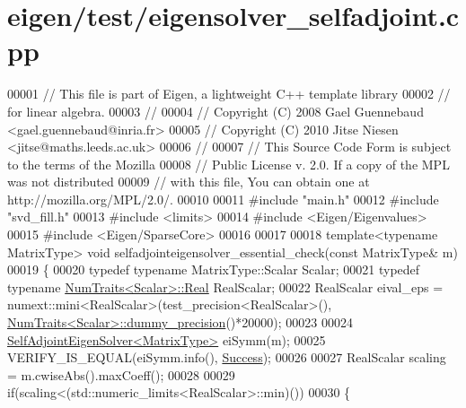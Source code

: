 \hypertarget{eigen_2test_2eigensolver__selfadjoint_8cpp_source}{}\section{eigen/test/eigensolver\+\_\+selfadjoint.cpp}
\label{eigen_2test_2eigensolver__selfadjoint_8cpp_source}

\begin{DoxyCode}
00001 \textcolor{comment}{// This file is part of Eigen, a lightweight C++ template library}
00002 \textcolor{comment}{// for linear algebra.}
00003 \textcolor{comment}{//}
00004 \textcolor{comment}{// Copyright (C) 2008 Gael Guennebaud <gael.guennebaud@inria.fr>}
00005 \textcolor{comment}{// Copyright (C) 2010 Jitse Niesen <jitse@maths.leeds.ac.uk>}
00006 \textcolor{comment}{//}
00007 \textcolor{comment}{// This Source Code Form is subject to the terms of the Mozilla}
00008 \textcolor{comment}{// Public License v. 2.0. If a copy of the MPL was not distributed}
00009 \textcolor{comment}{// with this file, You can obtain one at http://mozilla.org/MPL/2.0/.}
00010 
00011 \textcolor{preprocessor}{#include "main.h"}
00012 \textcolor{preprocessor}{#include "svd\_fill.h"}
00013 \textcolor{preprocessor}{#include <limits>}
00014 \textcolor{preprocessor}{#include <Eigen/Eigenvalues>}
00015 \textcolor{preprocessor}{#include <Eigen/SparseCore>}
00016 
00017 
00018 \textcolor{keyword}{template}<\textcolor{keyword}{typename} MatrixType> \textcolor{keywordtype}{void} selfadjointeigensolver\_essential\_check(\textcolor{keyword}{const} MatrixType& m)
00019 \{
00020   \textcolor{keyword}{typedef} \textcolor{keyword}{typename} MatrixType::Scalar Scalar;
00021   \textcolor{keyword}{typedef} \textcolor{keyword}{typename} \hyperlink{group___core___module_struct_eigen_1_1_num_traits}{NumTraits<Scalar>::Real} RealScalar;
00022   RealScalar eival\_eps = numext::mini<RealScalar>(test\_precision<RealScalar>(),  
      \hyperlink{group___core___module_struct_eigen_1_1_num_traits}{NumTraits<Scalar>::dummy\_precision}()*20000);
00023   
00024   \hyperlink{group___eigenvalues___module_class_eigen_1_1_self_adjoint_eigen_solver}{SelfAdjointEigenSolver<MatrixType>} eiSymm(m);
00025   VERIFY\_IS\_EQUAL(eiSymm.info(), \hyperlink{group__enums_gga85fad7b87587764e5cf6b513a9e0ee5ea52581b035f4b59c203b8ff999ef5fcea}{Success});
00026 
00027   RealScalar scaling = m.cwiseAbs().maxCoeff();
00028 
00029   \textcolor{keywordflow}{if}(scaling<(std::numeric\_limits<RealScalar>::min)())
00030   \{

\end{DoxyCode}
